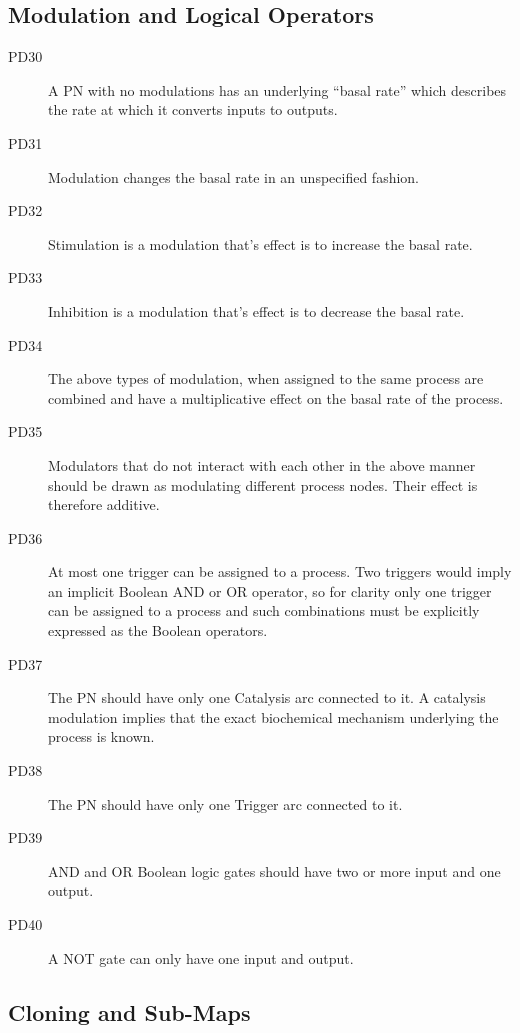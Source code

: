 \subsection{Modulation and Logical Operators}

\begin{description}
\item[PD30] A PN with no modulations has an underlying “basal rate” which describes the rate at which it converts inputs to outputs.
\item[PD31] Modulation changes the basal rate in an unspecified fashion.
\item[PD32] Stimulation is a modulation that’s effect is to increase the basal rate.
\item[PD33] Inhibition is a modulation that’s effect is to decrease the basal rate.
\item[PD34] The above types of modulation, when assigned to the same process are combined and have a multiplicative effect on the basal rate of the process.
\item[PD35] Modulators that do not interact with each other in the above manner should be drawn as modulating different process nodes. Their effect is therefore additive.
\item[PD36] At most one trigger can be assigned to a process. Two triggers would imply an implicit Boolean AND or OR operator, so for clarity only one trigger can be assigned to a process and such combinations must be explicitly expressed as the Boolean operators.
\item[PD37] The PN should have only one Catalysis arc connected to it. A catalysis modulation implies that the exact biochemical mechanism underlying the process is known.
\item[PD38] The PN should have only one Trigger arc connected to it.
\item[PD39] AND and OR Boolean logic gates should have two or more input and one output.
\item[PD40] A NOT gate can only have one input and output.
\end{description}

\subsection{Cloning and Sub-Maps}

